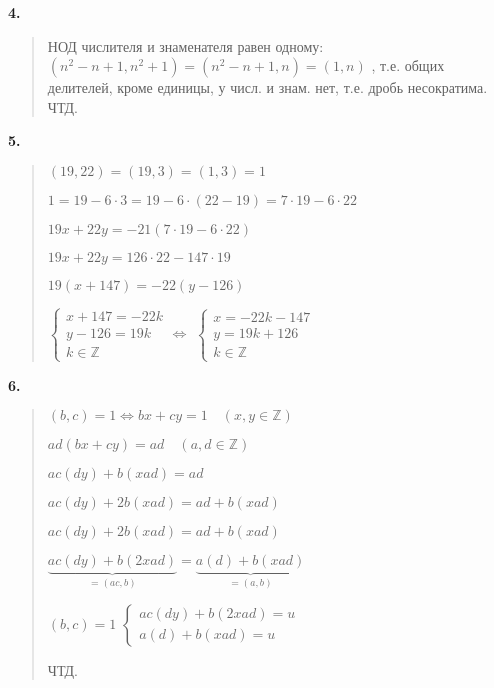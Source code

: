 \documentclass{article}
\begin{document}
\textbf{\textsf{4.}}
\begin{quote}
НОД числителя и знаменателя равен одному: $(n^2 - n + 1, n ^ 2 + 1) = (n^2 - n + 1, n) = (1, n)$ 
, т.е. общих делителей, кроме единицы, у числ. и знам. нет, т.е.  дробь несократима. ЧТД.
\end{quote}

\textbf{\textsf{5.}}
\begin{quote}
$(19, 22) = (19, 3) = (1, 3) = 1$

$1 = 19 - 6 \cdot 3 =  19 - 6 \cdot (22 - 19) = 7 \cdot 19 - 6 \cdot 22$


\begin{center}

$19x + 22y = -21(7 \cdot 19 - 6 \cdot 22)$

$19x + 22y = 126 \cdot 22 - 147 \cdot 19$

$19(x + 147) = -22 (y - 126)$


$\begin{cases}
    x + 147 = -22k \\
    y - 126 = 19k \\
k \in \mathbb{Z}
\end{cases}\Leftrightarrow$
$\begin{cases}
    x = -22k - 147 \\
    y  = 19k + 126 \\
k \in \mathbb{Z}
\end{cases}$
\end{center}
\end{quote}

\textbf{\textsf{6.}}
\begin{quote}
$(b, c) = 1 \Leftrightarrow bx + cy = 1 \quad (x, y \in \mathbb{Z})$

$ad(bx + cy) = ad \quad (a, d \in \mathbb{Z})$

$ac(dy) + b(xad) = ad$

$ac(dy) + 2b(xad) = ad + b(xad)$

$ac(dy) + 2b(xad) = ad + b(xad)$

$\underbrace{ac(dy) + b(2xad)}_{=(ac, b)} = \underbrace{a(d) + b(xad)}_{=(a, b)}$

$(b, c) = 1$ \Longleftrightarrow
$\begin{cases}
    ac(dy) + b(2xad) = u \\
    a(d) + b(xad) = u 
\end{cases}$


ЧТД.
\end{quote}
\end{document}
